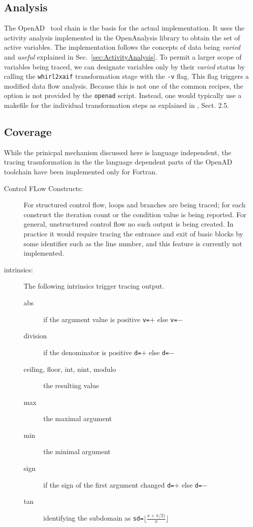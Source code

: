 \documentclass{article}
\newcommand{\openad}{OpenAD}
\newcommand{\refsec}[1]{{Sec.~\ref{#1}}}
\begin{document}
\subsection{Analysis}\label{sec:analysis}
 
The \openad\ \cite{openad} tool chain is the basis for the actual implementation. 
It uses the activity analysis implemented in the OpenAnalysis \cite{oaWeb} library 
to obtain the set of active variables. 
The implementation follows the concepts of data being {\em varied} and {\em useful}
explained in \refsec{sec:ActivityAnalysis}. 
To permit a larger scope of variables being traced, we can designate variables only 
by their {\em varied} status by calling the \lstinline{whirl2xaif} transformation stage 
with the \lstinline{-v} flag. This flag triggers a modified data flow analysis. 
Because this is not one of the common recipes, the option is not provided by 
the \lstinline{openad} script. Instead, one would typically use a makefile 
for the individual transformation steps as explained in  \cite{userManual}, Sect. 2.5.
      
\subsection{Coverage}
While the prinicpal mechanism discussed here is language independent,
the tracing trasnformation in the  
the language dependent parts of the OpenAD toolchain have been implemented only for Fortran. 
\begin{description}
\item[Control FLow Constructs:] For structured control flow,  loops and branches are being traced; 
for each construct the iteration count or the condition value is being reported. 
For general, unstructured control flow no such output is being created. In practice 
it would require tracing the entrance and exit of basic blocks by some identifier such as the line number,
and this feature is currently not implemented.
\item[intrinsics:] The following intrinsics trigger tracing output.
\begin{description}
\item[abs] if the argument value is positive \lstinline{v=}$+$ else \lstinline{v=}$-$
\item[division] if the denominator is positive \lstinline{d=}$+$ else \lstinline{d=}$-$   
\item[ceiling, floor, int, nint, modulo] the resulting value
\item[max] the maximal argument
\item[min] the minimal argument
\item[sign] if the sign of the first argument changed \lstinline{d=}$+$ else \lstinline{d=}$-$
\item[tan] identifying the subdomain as \lstinline{sd=}$\lfloor\frac{x+\pi/2)}{\pi}\rfloor$ 
\end{description}
\end{description}
\end{document}
